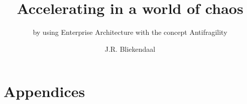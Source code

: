 \documentclass[10pt,a4paper,abstract=true]{scrreprt}
\title{Accelerating in a world of chaos}
\subtitle{by using Enterprise Architecture with the concept Antifragility}
\author{J.R. Bliekendaal}
\begin{document}

\tableofcontents				%
\listoffigures					%
\listoftables					%

\clearpage
{}			%


\printunsrtglossaries			%
\printbibliography				%

\appendix
\chapter{Appendices}


% 
\end{document}

